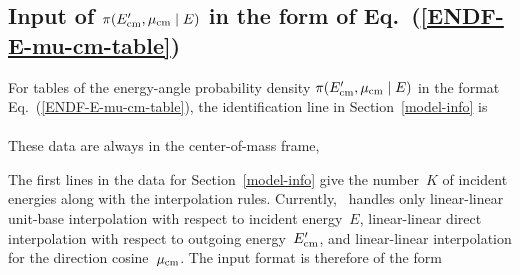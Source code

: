    \\
   \\
 \\
\\
  \\
  \\
  \\
  \\
  \\
  \Input{ $\cdots$}{}\\
  \\
  \\
  \\
  \Input{ \indent }{ $\cdots$}\\
  \\
 
 \subsection{Input of $\pi(E_{\text{cm}}', \mu_{\text{cm}} \mid E)$ in the form of Eq.~(\ref{ENDF-E-mu-cm-table})}
For tables of the energy-angle probability density $\pi(E_{\text{cm}}', \mu_{\text{cm}} \mid E)$
in the format Eq.~(\ref{ENDF-E-mu-cm-table}), the identification line in
Section~\ref{model-info} is\\
      \\
These data are always in the center-of-mass frame,\\

The first lines in the data for Section~\ref{model-info} give the number~$K$
of incident energies along with the interpolation rules.  Currently,
\gettransfer\ handles only linear-linear unit-base interpolation with
respect to incident energy~$E$, linear-linear direct interpolation
with respect to outgoing energy~$E_{\text{cm}}'$, and linear-linear interpolation
for the direction cosine~$\mu_{\text{cm}}$.  The input format is therefore of the form\\
  \\
  \\
  \\
  \\

